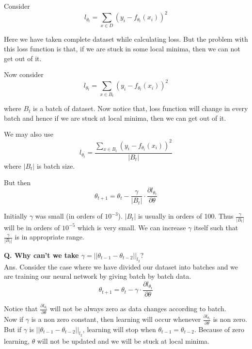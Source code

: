 \documentclass[11pt, twosides]{article}
\begin{document}
Consider 
\begin{equation}
    l_{\theta_t} = \sum_{x \in D} (y_i - f_{\theta_t}(x_i))^2
\end{equation}

Here we have taken complete dataset while calculating loss. But the problem with this loss function is that, if we are stuck in some local minima, then we can not get out of it.

Now consider
\begin{equation}
    l_{\theta_t} = \sum_{x \in B_t} (y_i - f_{\theta_t}(x_i))^2
\end{equation}

where $B_t$ is a batch of dataset. 
Now notice that, loss function will change in every batch and hence if we are stuck at local minima, then we can get out of it.

We may also use 
\begin{equation}
    l_{\theta_t} = \frac{\sum_{x \in B_t} (y_i - f_{\theta_t}(x_i))^2}{|B_t|}
\end{equation}
where $|B_t|$ is batch size. 

But then 
\begin{equation}
    \theta_{t+1} = \theta_t - \frac{\gamma}{|B_t|} \cdot \frac{\partial l_{\theta_t}}{\partial \theta}
\end{equation}

Initially $\gamma$ was small (in orders of $10^{-3}$). $|B_t|$ is usually in orders of 100. Thus $\frac{\gamma}{|B_t|}$ will be in orders of $10^{-5}$ which is very small. We can increase $\gamma$ itself such that $\frac{\gamma}{|B_t|}$ is in appropriate range.

\begin{flushleft}
\textbf{Q. Why can't we take $\gamma = || \theta_{t-1} - \theta_{t-2}||_{l_2}?$}\\
Ans. \color{blue} Consider the case where we have divided our dataset into batches and we are training our neural network by giving batch by batch data.
\begin{equation}
    \theta_{t+1} = \theta_t - \gamma \cdot \frac{\partial l_{\theta_t}}{\partial \theta}
\end{equation}

Notice that $\frac{\partial l_{\theta_t}}{\partial \theta}$ will not be always zero as data changes according to batch. \\
Now if $\gamma$ is a non zero constant, then learning will occur whenever $\frac{\partial l_{\theta_t}}{\partial \theta}$ is non zero.\\
But if $\gamma$ is $|| \theta_{t-1} - \theta_{t-2}||_{l_2}$, learning will stop when $\theta_{t-1} = \theta_{t-2}$. Because of zero learning, $\theta$ will not be updated and we will be stuck at local minima.

\end{flushleft}
\end{document}
